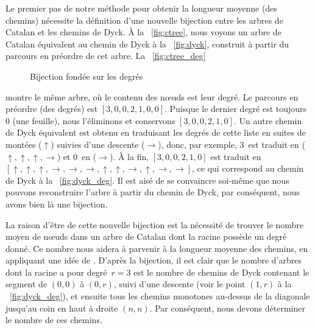 Le premier pas de notre méthode pour obtenir la longueur moyenne (des
chemins) nécessite la définition d'une nouvelle bijection entre les
arbres de Catalan et les chemins de Dyck. À la \fig~\vref{fig:ctree},
nous voyons un arbre de Catalan équivalent au chemin de Dyck à la
\fig~\ref{fig:dyck}, construit à partir du parcours en préordre de cet
arbre. La \fig~\ref{fig:ctree_deg}
\begin{figure}
\centering
{}
\qquad
{}
\caption{Bijection fondée sur les degrés}
\label{fig:bijection_deg}
\end{figure}
montre le même arbre, où le contenu des n{\oe}uds est leur degré. Le
parcours en préordre (des degrés) est \([3,0,0,2,1,0,0]\). Puisque le
dernier degré est toujours~\(0\) (une feuille), nous l'éliminons et
conservons \([3,0,0,2,1,0]\). Un autre chemin de Dyck équivalent est
obtenu en traduisant les degrés de cette liste en suites de montées
(\(\uparrow\)) suivies d'une descente (\(\rightarrow\)), donc, par
exemple, \(3\)~est traduit en (\(\uparrow, \uparrow, \uparrow,
\rightarrow\)) et \(0\)~en (\(\rightarrow\)). À la fin,
\([3,0,0,2,1,0]\) est traduit en \([\uparrow, \uparrow, \uparrow,
\rightarrow, \rightarrow, \rightarrow, \uparrow, \uparrow,
\rightarrow, \uparrow, \rightarrow, \rightarrow]\), ce qui correspond
au chemin de Dyck à la \fig~\ref{fig:dyck_deg}. Il est aisé de se
convaincre soi-même que nous pouvons reconstruire l'arbre à partir du
chemin de Dyck, par conséquent, nous avons bien là une bijection.

La raison d'être de cette nouvelle bijection est la nécessité de
trouver le nombre moyen de n{\oe}uds dans un arbre de Catalan dont la
racine possède un degré donné. Ce nombre nous aidera à parvenir à la
longueur moyenne des chemins, en appliquant une idée de
\cite{Ruskey_1983}. D'après la bijection, il est clair que le nombre
d'arbres dont la racine a pour degré~\(r=3\) est le nombre de chemins
de Dyck contenant le segment de \((0,0)\) à \((0,r)\), suivi d'une
descente (voir le point \((1,r)\) à la \fig~\ref{fig:dyck_deg}), et
ensuite tous les chemins monotones au-dessus de la diagonale jusqu'au
coin en haut à droite \((n,n)\).  Par conséquent, nous devons
déterminer le nombre de ces chemins.

